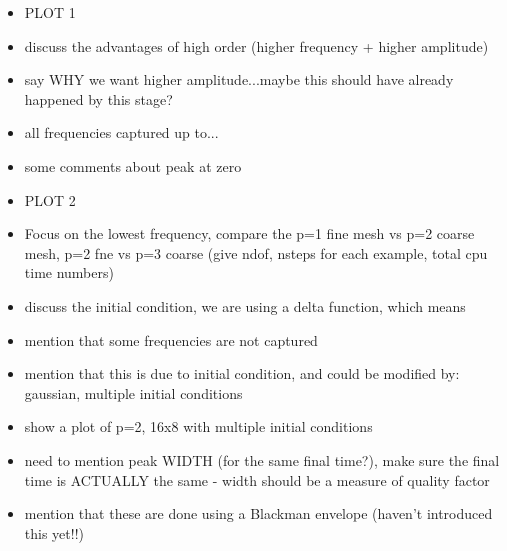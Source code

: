 \begin{itemize}
\item PLOT 1
\item discuss the advantages of high order (higher frequency + higher amplitude)
\item say WHY we want higher amplitude...maybe this should have already happened by this stage?
\item all frequencies captured up to...
\item some comments about peak at zero
\item PLOT 2
\item Focus on the lowest frequency, compare the p=1 fine mesh vs p=2 coarse
  mesh, p=2 fne vs p=3 coarse (give ndof, nsteps for each example, total cpu time numbers)
\item discuss the initial condition, we are using a delta function, which means
\item mention that some frequencies are not captured
\item mention that this is due to initial condition, and could be modified by: gaussian, multiple initial conditions
\item show a plot of p=2, 16x8 with multiple initial conditions
\item need to mention peak WIDTH (for the same final time?), make sure the final
  time is ACTUALLY the same - width should be a measure of quality factor
\item mention that these are done using a Blackman envelope (haven't introduced
  this yet!!)
\end{itemize}

